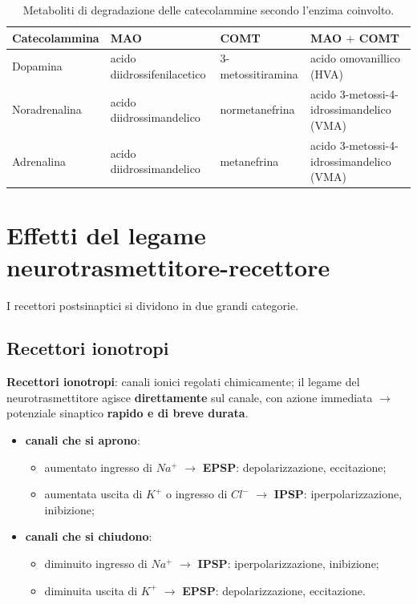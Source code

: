 \begin{table}[htbp]
  \centering
  \small
  \renewcommand{\arraystretch}{1.3}
  \begin{tabularx}{\textwidth}{|l|X|X|X|}
    \hline
    \textbf{Catecolammina} & \textbf{MAO} & \textbf{COMT} & \textbf{MAO $+$ COMT} \\
    \hline
    Dopamina & acido diidrossifenilacetico & 3-metossitiramina & acido omovanillico (HVA) \\
    \hline
    Noradrenalina & acido diidrossimandelico & normetanefrina
      & acido 3-metossi-4-idrossimandelico (VMA) \\
    \hline
    Adrenalina & acido diidrossimandelico & metanefrina
      & acido 3-metossi-4-idrossimandelico (VMA) \\
    \hline
  \end{tabularx}
  \caption{Metaboliti di degradazione delle catecolammine secondo l'enzima coinvolto.}
  \label{tab:degradazione-catecolammine}
\end{table}

\section{Effetti del legame neurotrasmettitore-recettore}

I recettori postsinaptici si dividono in due grandi categorie.

\subsection{Recettori ionotropi}

\textbf{Recettori ionotropi}: canali ionici regolati chimicamente; il legame del neurotrasmettitore
agisce \textbf{direttamente} sul canale, con azione immediata $\rightarrow$ potenziale sinaptico
\textbf{rapido e di breve durata}.
\begin{itemize}
  \item \textbf{canali che si aprono}:
    \begin{itemize}
      \item aumentato ingresso di $Na^+$ $\rightarrow$ \textbf{EPSP}: depolarizzazione, eccitazione;
      \item aumentata uscita di $K^+$ o ingresso di $Cl^-$ $\rightarrow$ \textbf{IPSP}:
        iperpolarizzazione, inibizione;
    \end{itemize}
  \item \textbf{canali che si chiudono}:
    \begin{itemize}
      \item diminuito ingresso di $Na^+$ $\rightarrow$ \textbf{IPSP}: iperpolarizzazione,
        inibizione;
      \item diminuita uscita di $K^+$ $\rightarrow$ \textbf{EPSP}: depolarizzazione, eccitazione.
    \end{itemize}
\end{itemize}

